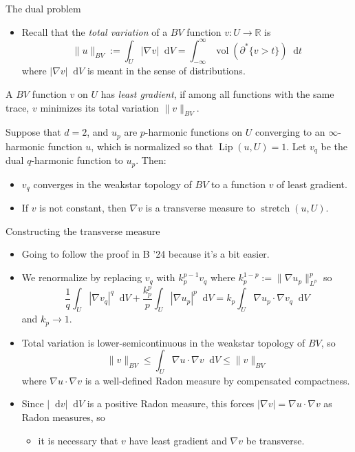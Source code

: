 \documentclass[10pt]{beamer}
\newcommand{\RR}{\mathbb{R}}
\newcommand*\dif{\mathop{}\!\mathrm{d}}
\DeclareMathOperator{\Lip}{Lip}
\DeclareMathOperator{\Stretch}{stretch}
\DeclareMathOperator{\vol}{vol}
\begin{document}
\begin{frame}{The dual problem}
\begin{itemize}
\item Recall that the \emph{total variation} of a $BV$ function $v: U \to \RR$ is 
$$\|u\|_{BV} := \int_U |\nabla v| \dif V = \int_{-\infty}^\infty \vol(\partial^* \{v > t\}) \dif t$$
where $|\nabla v| \dif V$ is meant in the sense of distributions. \pause
\end{itemize}

\begin{definition}
A $BV$ function $v$ on $U$ has \emph{least gradient}, if among all functions with the same trace, $v$ minimizes its total variation $\|v\|_{BV}$. \pause
\end{definition}

\begin{theorem}
Suppose that $d = 2$, and $u_p$ are $p$-harmonic functions on $U$ converging to an $\infty$-harmonic function $u$, which is normalized so that $\Lip(u, U) = 1$.
Let $v_q$ be the dual $q$-harmonic function to $u_p$.
Then: \pause
\begin{itemize}
\item $v_q$ converges in the weakstar topology of $BV$ to a function $v$ of least gradient.
\item If $v$ is not constant, then $\nabla v$ is a transverse measure to $\Stretch(u, U)$.
\end{itemize}
\end{theorem}
\end{frame}

\begin{frame}{Constructing the transverse measure}
\begin{itemize}
\item Going to follow the proof in B '24 because it's a bit easier. \pause
\item We renormalize by replacing $v_q$ with $k_p^{p - 1} v_q$ where $k_p^{1 - p} := \|\nabla u_p\|_{L^p}^p$ so
$$\frac{1}{q} \int_U |\nabla v_q|^q \dif V + \frac{k_p^p}{p} \int_U |\nabla u_p|^p \dif V = k_p \int_U \nabla u_p \cdot \nabla v_q \dif V$$
and $k_p \to 1$. \pause
\item Total variation is lower-semicontinuous in the weakstar topology of $BV$, so
$$\|v\|_{BV} \leq \int_U \nabla u \cdot \nabla v \dif V \leq \|v\|_{BV}$$
where $\nabla u \cdot \nabla v$ is a well-defined Radon measure by compensated compactness. \pause
\item Since $|\dif v| \dif V$ is a positive Radon measure, this forces $|\nabla v| = \nabla u \cdot \nabla v$ as Radon measures, so 
\begin{itemize}
\item it is necessary that $v$ have least gradient and $\nabla v$ be transverse.
\end{itemize}
\end{itemize}
\end{frame}
\end{document}
